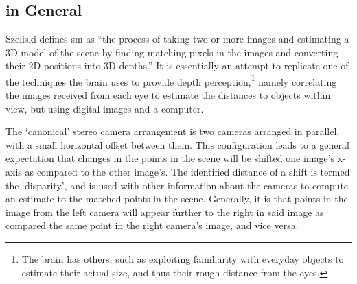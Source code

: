 \section{}



\subsection{\label{subsec:smgeneral} in General}
Szeliski defines \gls{sm} as ``the process of taking two or more images and estimating a 3D model of the scene by finding matching pixels in the images and converting their 2D positions into 3D depths.'' \cite[p. 469]{Szeliski2011}  It is essentially an attempt to replicate one of the techniques the brain uses to provide depth perception,\footnote{The brain has others, such as exploiting familiarity with everyday objects to estimate their actual size, and thus their rough distance from the eyes.} namely correlating the images received from each eye to estimate the distances to objects within view, but using digital images and a computer.

The `canonical' stereo camera arrangement is two cameras arranged in parallel, with a small horizontal offset between them.  This configuration leads to a general expectation that changes in the points in the scene will be shifted one image's x-axis as compared to the other image's.  The identified distance of a shift is termed the `\gls{disparity}', and is used with other information about the cameras to compute an estimate to the matched points in the scene.  Generally, it is  that points in the image from the left camera will appear further to the right in said image as compared the same point in the right camera's image, and vice versa.

